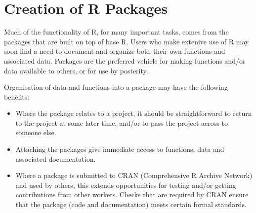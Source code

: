 \documentclass{tufte-book}\usepackage[]{graphicx}\usepackage[]{color}
\begin{document}
\section{Creation of R Packages}
Much of the functionality of R, for many important tasks, comes from
the packages that are built on top of base R. Users who make extenive
use of R may soon find a need to document and organize both their
own functions and associated data. Packages are the preferred vehicle
for making functions and/or data available to others, or for use by
posterity.

Organisation of data and functions into a package may have the
following benefits:
\begin{itemize}
\item Where the package relates to a project, it should be straightforward
to return to the project at some later time, and/or to pass the project
across to someone else.
\item Attaching the packages give immediate access to functions, data
  and associated documentation.
\item Where a package is submitted to CRAN (Comprehensive R Archive
  Network) and used by others, this extends opportunities for testing
  and/or getting contributions from other workers. Checks that are
  required by CRAN ensure that the package (code and documentation)
  meets certain formal standards.
\end{itemize}
\end{document}

